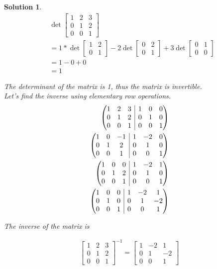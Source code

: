 \documentclass{article}
\newtheorem*{solution}{Solution}
\begin{document}
\begin{solution}
\begin{align*}
& \det \begin{bmatrix}
1 & 2 & 3 \\ 0 & 1 & 2 \\ 0 & 0 & 1
\end{bmatrix} \\
&= 1 * \det \begin{bmatrix}1 & 2 \\ 0 & 1\end{bmatrix} - 2 \det \begin{bmatrix}0 & 2 \\ 0 & 1\end{bmatrix} + 3 \det \begin{bmatrix}0 & 1 \\ 0 & 0\end{bmatrix} \\
&= 1 - 0 + 0 \\
&= 1
\end{align*}

The determinant of the matrix is 1, thus the matrix is invertible. \\

Let's find the inverse using elementary row operations. \\

\begin{align*}
\left( \begin{array}{@{}ccc|ccc@{}}
1 & 2 & 3 & 1 & 0 & 0 \\ 0 & 1 & 2 & 0 & 1 & 0 \\ 0 & 0 & 1 & 0 & 0 & 1
\end{array} \right) \\
\left( \begin{array}{@{}ccc|ccc@{}}
1 & 0 & -1 & 1 & -2 & 0 \\ 0 & 1 & 2 & 0 & 1 & 0 \\ 0 & 0 & 1 & 0 & 0 & 1
\end{array} \right) \\
\left( \begin{array}{@{}ccc|ccc@{}}
1 & 0 & 0 & 1 & -2 & 1 \\ 0 & 1 & 2 & 0 & 1 & 0 \\ 0 & 0 & 1 & 0 & 0 & 1
\end{array} \right) \\
\left( \begin{array}{@{}ccc|ccc@{}}
1 & 0 & 0 & 1 & -2 & 1 \\ 0 & 1 & 0 & 0 & 1 & -2 \\ 0 & 0 & 1 & 0 & 0 & 1
\end{array} \right)
\end{align*}

The inverse of the matrix is 

\begin{align*}
\begin{bmatrix}
1 & 2 & 3 \\ 0 & 1 & 2 \\ 0 & 0 & 1
\end{bmatrix}^{-1} = \begin{bmatrix}
1 & -2 & 1 \\ 0 & 1 & -2 \\ 0 & 0 & 1
\end{bmatrix}
\end{align*}

\end{solution}
\end{document}
